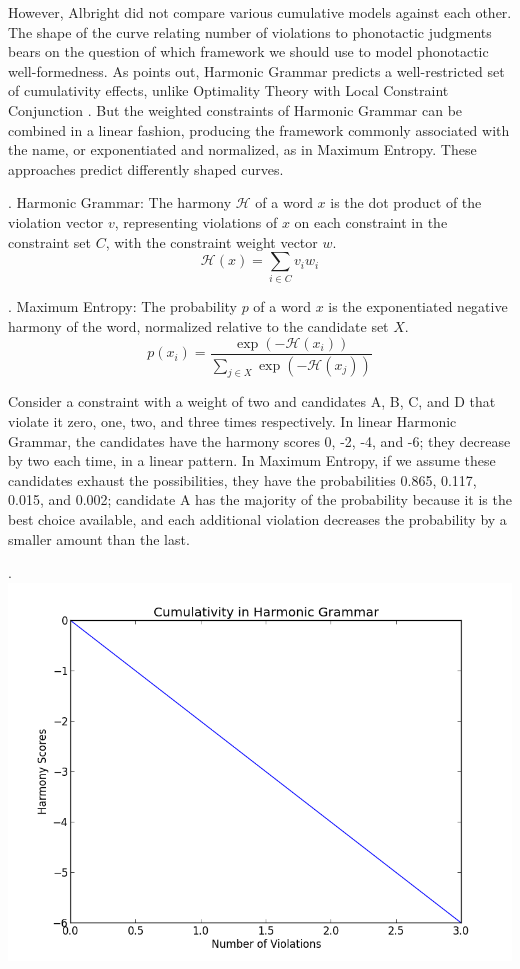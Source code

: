 
However, Albright did not compare various cumulative models against each other.
The shape of the curve relating number of violations to phonotactic judgments
bears on the question of which framework we should use to model phonotactic
well-formedness. As \citet{Pater_cumulative_2008} points out, Harmonic Grammar
predicts a well-restricted set of cumulativity effects, unlike Optimality
Theory with Local Constraint Conjunction \citep{Smolensky2006d}.
But the weighted constraints of Harmonic Grammar can be combined in a linear fashion,
producing the framework commonly associated with the name, or exponentiated and normalized,
as in Maximum Entropy. These approaches predict differently shaped curves.

\ex. Harmonic Grammar: The harmony $\mathcal{H}$ of a word $x$ is the dot product of the violation vector $v$,
representing violations of $x$ on each constraint in the constraint set $C$, with the constraint
weight vector $w$.\\
\[\mathcal{H}(x) = \sum_{i \in C}{v_iw_i}\]

\ex. Maximum Entropy: The probability $p$ of a word $x$ is the exponentiated negative harmony
of the word, normalized relative to the candidate set $X$.\\
\[p(x_i) = \frac{\exp(-\mathcal{H}(x_i))}{\sum_{j \in X}{\exp(-\mathcal{H}(x_j))}}\]

Consider a constraint with a weight
of two and candidates A, B, C, and D that violate it zero, one, two, and three
times respectively. In linear Harmonic Grammar, the candidates have the harmony scores
0, -2, -4, and -6; they decrease by two each time, in a linear pattern. In
Maximum Entropy, if we assume these candidates exhaust the possibilities, they
have the probabilities 0.865, 0.117, 0.015, and 0.002; candidate A has the
majority of the probability because it is the best choice available, and each
additional violation decreases the probability by a smaller amount than the
last.

\ex. \includegraphics[scale=.5]{hg_cumulativity.png}

